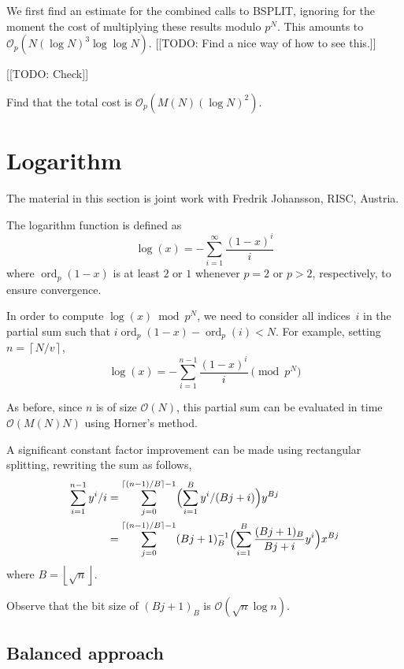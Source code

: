 \documentclass[a4paper,11pt]{article}
\theoremstyle{definition}
\DeclareMathOperator{\ord}{ord}
\providecommand{\ceil}[1]{\left\lceil#1\right\rceil}%
\providecommand{\floor}[1]{\left\lfloor#1\right\rfloor}%
\begin{document}
We first find an estimate for the combined calls to BSPLIT, ignoring for 
the moment the cost of multiplying these results modulo $p^N$.  This 
amounts to $\mathcal{O}_p(N (\log N)^3 \log \log N)$.  [[TODO:  Find 
a nice way of how to see this.]]

[[TODO:  Check]]

Find that the total cost is $\mathcal{O}_p (M(N) (\log N)^2)$.

\section{Logarithm}

The material in this section is joint work 
with Fredrik Johansson, RISC, Austria.

The logarithm function is defined as 
\begin{equation}
\log(x) = - \sum_{i=1}^{\infty} \frac{(1-x)^i}{i}
\end{equation}
where $\ord_p(1 - x)$ is at least $2$ or $1$ whenever $p = 2$ or $p > 2$, 
respectively, to ensure convergence.

In order to compute $\log(x) \bmod p^N$, we need to consider all indices~$i$ 
in the partial sum such that $i \ord_p(1-x) - \ord_p(i) < N$.  For example, 
setting $n = \ceil{N/v}$, 
\begin{equation*}
\log(x) = - \sum_{i=1}^{n-1} \frac{(1-x)^i}{i} \pmod{p^N}
\end{equation*}

As before, since $n$ is of size $\mathcal{O}(N)$, this partial sum 
can be evaluated in time $\mathcal{O}(M(N) N)$ using Horner's method.

A significant constant factor improvement can be made using 
rectangular splitting, rewriting the sum as follows, 
\begin{align}
\sum_{i=1}^{n-1} y^i / i
& = \sum_{j=0}^{\ceil{(n-1)/B} - 1} \Bigl( \sum_{i=1}^B y^i / (Bj + i) \Bigr) y^{Bj} \\
& = \sum_{j=0}^{\ceil{(n-1)/B} - 1} (Bj+1)_B^{-1} \Bigl( \sum_{i=1}^B \frac{(Bj+1)_B}{Bj + i} y^i \Bigr) x^{Bj}
\end{align}
where $B = \floor{\sqrt{n}}$.  

Observe that the bit size of $(Bj + 1)_B$ is $\mathcal{O}(\sqrt{n} \log n)$.

\subsection{Balanced approach}
\end{document}
